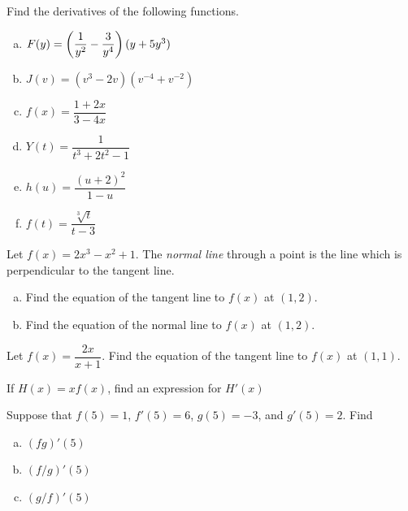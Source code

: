 \documentclass[notes]{subfiles}
\begin{document}
		\begin{ex}
			Find the derivatives of the following functions.
			\begin{enumerate}[(a)]
				\item \(F(y) = \left( \dfrac{1}{y^2}-\dfrac{3}{y^4}\right)(y+5y^3)\)
					\newpage
					
				\item \(J(v) = (v^3-2v)(v^{-4}+v^{-2})\)
					
				\item \(f(x) = \dfrac{1+2x}{3-4x}\)
					
				\item \(Y(t)=\dfrac{1}{t^3+2t^2-1}\)
					
		 		\item \(h(u) = \dfrac{(u+2)^2}{1-u}\)
		 			\newpage
		 			
				\item \(f(t) = \dfrac{\sqrt[3]{t}}{t-3}\)
					
			\end{enumerate}
		\end{ex}
		
		\begin{ex}
			Let \(f(x) = 2x^3-x^2+1\).  The \emph{normal line} through a point is the line which is perpendicular to the tangent line.
			\begin{enumerate}[(a)]
				\item Find the equation of the tangent line to \(f(x)\) at \((1,2)\).
					\vs{1}
					
				\item Find the equation of the normal line to \(f(x)\) at \((1,2)\).
					\vs{1}
			\end{enumerate}
		\end{ex}
			
		\begin{ex}
			Let \(f(x) = \dfrac{2x}{x+1}\). Find the equation of the tangent line to \(f(x)\) at \((1,1)\).

		\end{ex}

		\begin{ex}
			If \(H(x) = xf(x)\), find an expression for \(H'(x)\)
		\end{ex}
			\vs{.75}
			\newpage
			
		\begin{ex}
			Suppose that \(f(5) = 1\), \(f'(5) = 6\), \(g(5) = -3\), and \(g'(5) = 2\).  Find
			\begin{enumerate}[(a)]
				\item \((fg)'(5)\)
					\vs{.5}
					
				\item \((f/g)'(5)\)
					\vs{.5}
					
				\item \((g/f)'(5)\)
					\vs{.5}
					
			\end{enumerate}
		\end{ex}
		
\end{document}
